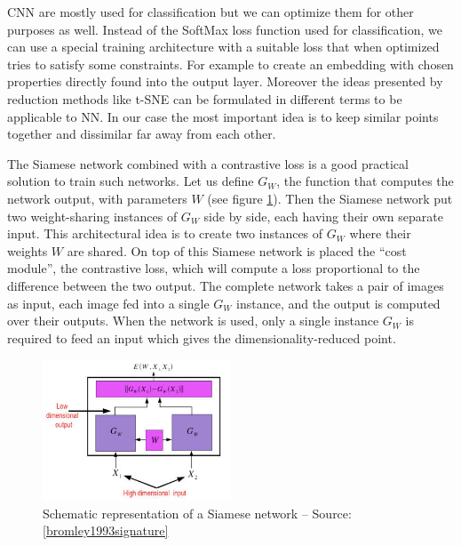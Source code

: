 \documentclass[a4paper,12pt]{report}
\begin{document}
CNN are mostly used for classification but we can optimize them for other purposes as well.
Instead of the SoftMax loss function used for classification, we can use a special training architecture with a suitable loss that when optimized tries to satisfy some constraints.
For example to create an embedding with chosen properties directly found into the output layer.
Moreover the ideas presented by reduction methods like t-SNE can be formulated in different terms to be applicable to NN.
In our case the most important idea is to keep similar points together and dissimilar far away from each other.

The Siamese network combined with a contrastive loss is a good practical solution to train such networks\cite{bromley1993signature}\cite{chopra2005learning}.
Let us define $G_W$, the function that computes the network output, with parameters $W$ (see figure \ref{fig:siamese_network}).
Then the Siamese network put two weight-sharing instances of $G_W$ side by side, each having their own separate input.
This architectural idea is to create two instances of $G_W$ where their weights $W$ are shared.
On top of this Siamese network is placed the ``cost module'', the contrastive loss, which will compute a loss proportional to the difference between the two output.
The complete network takes a pair of images as input, each image fed into a single $G_W$ instance, and the output is computed over their outputs.
When the network is used, only a single instance $G_W$ is required to feed an input which gives the dimensionality-reduced point.

\begin{figure}[t]
    \begin{center}
        \includegraphics[width=0.5\textwidth]{thesis_figures/siamese_network.jpg}
    \end{center}
    \caption{Schematic representation of a Siamese network -- Source: \ref{bromley1993signature}}
    \label{fig:siamese_network}
\end{figure}
\end{document}
